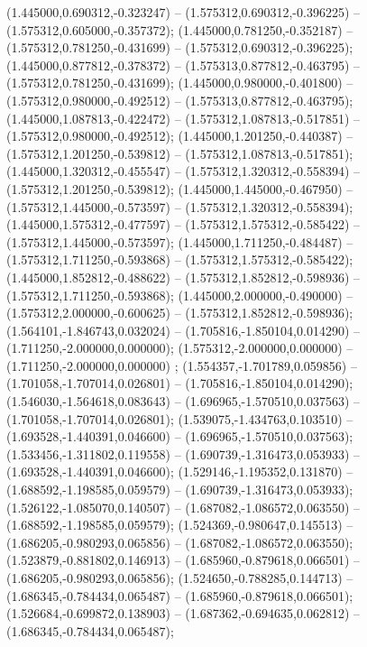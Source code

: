 (1.445000,0.690312,-0.323247) -- (1.575312,0.690312,-0.396225) -- (1.575312,0.605000,-0.357372);
 (1.445000,0.781250,-0.352187) -- (1.575312,0.781250,-0.431699) -- (1.575312,0.690312,-0.396225);
 (1.445000,0.877812,-0.378372) -- (1.575313,0.877812,-0.463795) -- (1.575312,0.781250,-0.431699);
 (1.445000,0.980000,-0.401800) -- (1.575312,0.980000,-0.492512) -- (1.575313,0.877812,-0.463795);
 (1.445000,1.087813,-0.422472) -- (1.575312,1.087813,-0.517851) -- (1.575312,0.980000,-0.492512);
 (1.445000,1.201250,-0.440387) -- (1.575312,1.201250,-0.539812) -- (1.575312,1.087813,-0.517851);
 (1.445000,1.320312,-0.455547) -- (1.575312,1.320312,-0.558394) -- (1.575312,1.201250,-0.539812);
 (1.445000,1.445000,-0.467950) -- (1.575312,1.445000,-0.573597) -- (1.575312,1.320312,-0.558394);
 (1.445000,1.575312,-0.477597) -- (1.575312,1.575312,-0.585422) -- (1.575312,1.445000,-0.573597);
 (1.445000,1.711250,-0.484487) -- (1.575312,1.711250,-0.593868) -- (1.575312,1.575312,-0.585422);
 (1.445000,1.852812,-0.488622) -- (1.575312,1.852812,-0.598936) -- (1.575312,1.711250,-0.593868);
 (1.445000,2.000000,-0.490000) -- (1.575312,2.000000,-0.600625) -- (1.575312,1.852812,-0.598936);
 (1.564101,-1.846743,0.032024) -- (1.705816,-1.850104,0.014290) -- (1.711250,-2.000000,0.000000);
 (1.575312,-2.000000,0.000000) -- (1.711250,-2.000000,0.000000) ;
 (1.554357,-1.701789,0.059856) -- (1.701058,-1.707014,0.026801) -- (1.705816,-1.850104,0.014290);
 (1.546030,-1.564618,0.083643) -- (1.696965,-1.570510,0.037563) -- (1.701058,-1.707014,0.026801);
 (1.539075,-1.434763,0.103510) -- (1.693528,-1.440391,0.046600) -- (1.696965,-1.570510,0.037563);
 (1.533456,-1.311802,0.119558) -- (1.690739,-1.316473,0.053933) -- (1.693528,-1.440391,0.046600);
 (1.529146,-1.195352,0.131870) -- (1.688592,-1.198585,0.059579) -- (1.690739,-1.316473,0.053933);
 (1.526122,-1.085070,0.140507) -- (1.687082,-1.086572,0.063550) -- (1.688592,-1.198585,0.059579);
 (1.524369,-0.980647,0.145513) -- (1.686205,-0.980293,0.065856) -- (1.687082,-1.086572,0.063550);
 (1.523879,-0.881802,0.146913) -- (1.685960,-0.879618,0.066501) -- (1.686205,-0.980293,0.065856);
 (1.524650,-0.788285,0.144713) -- (1.686345,-0.784434,0.065487) -- (1.685960,-0.879618,0.066501);
 (1.526684,-0.699872,0.138903) -- (1.687362,-0.694635,0.062812) -- (1.686345,-0.784434,0.065487);

